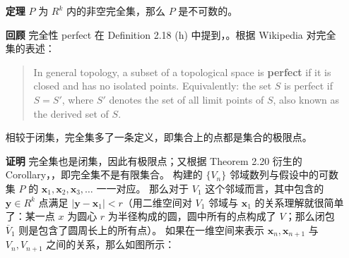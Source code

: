 \documentclass[../poma-notes.tex]{subfiles}
\begin{document}
\begin{anote}
  \begin{itemize}
    \item [\textbf{定理}] $P$ 为 $R^k$ 内的非空完全集，那么 $P$ 是不可数的。
    \item [\textbf{回顾}] 完全性 perfect 在 Definition 2.18 (h) 中提到，。根据 Wikipedia 对完全集的表述：
          \begin{quote}
            In general topology, a subset of a topological space is \textbf{perfect} if it is closed and has no isolated
            points. Equivalently: the set $S$ is perfect if $S = S'$, where $S'$ denotes the set of all limit points of
            $S$, also known as the derived set of $S$.
          \end{quote}
          相较于闭集，完全集多了一条定义，即集合上的点都是集合的极限点。
    \item [\textbf{证明}] 完全集也是闭集，因此有极限点；又根据 Theorem 2.20 衍生的 Corollary，，即完全集不是有限集合。
          构建的 $\{V_n\}$ 邻域数列与假设中的可数集 $P$ 的 $\mathbf{x}_1,\mathbf{x}_2,\mathbf{x}_3,\dots$ 一一对应。
          那么对于 $V_1$ 这个邻域而言，其中包含的 $\mathbf{y} \in R^k$ 点满足 $|\mathbf{y} - \mathbf{x}_1| < r$（用二维空间对
          $V_1$ 邻域与 $\mathbf{x}_1$ 的关系理解就很简单了：某一点 $x$ 为圆心 $r$ 为半径构成的圆，圆中所有的点构成了 $V$；那么闭包
          $\overline{V}_1$ 则是包含了圆周长上的所有点）。
          如果在一维空间来表示 $\mathbf{x}_n, \mathbf{x}_{n+1}$ 与 $V_n, V_{n+1}$ 之间的关系，那么如图所示：
          \begin{center}
\end{center}
\end{itemize}
\end{anote}
\end{document}

